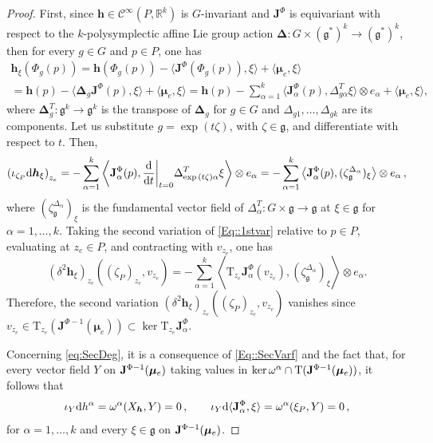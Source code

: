\documentclass[11pt]{article}
\theoremstyle{plain}
\theoremstyle{definition}
\newcommand\restr[2]{{%
  \left.\kern-\nulldelimiterspace %
  #1 %
  \right|_{#2} %
}}
\newcommand{\R}{\mathbb{R}}
\newcommand{\Cinfty}{\mathscr{C}^\infty}
\newcommand{\T}{\mathrm{T}}
\newcommand{\bh}{{\boldsymbol{h}}}
\renewcommand{\d}{\mathrm{d}}
\newcommand*{\inn}[1]{\iota_{#1}}
\def\d{\mathrm{d}}
\numberwithin{equation}{section}
\begin{document}
\begin{proof}
First, since $\bh\in \Cinfty(P,\R^k)$ is $G$-invariant and $\mathbf{J}^\Phi$ is equivariant with respect to the $k$-polysymplectic affine Lie group action $\boldsymbol{\Delta}:G \times (\mathfrak{g}^*)^k\rightarrow (\mathfrak{g}^*)^k$, then for every $g\in G$ and $p\in P$, one has
\begin{multline*}
\boldsymbol{h}_\xi(\Phi_g(p)) = \boldsymbol{h}(\Phi_g(p))-\langle \mathbf{J}^\Phi(\Phi_g(p)),\xi\rangle +\langle {\bm \mu}_e,\xi\rangle \\
= \boldsymbol{h}(p)-\langle \boldsymbol{\Delta}_g\mathbf{J}^\Phi(p),\xi\rangle +\langle \bm\mu_e,\xi\rangle %
=\boldsymbol{h}(p)-\sum_{\alpha=1}^k\langle \mathbf{J}_\alpha^\Phi(p),\Delta_{g\alpha}^T\xi\rangle \otimes e_\alpha+\langle \bm\mu_e,\xi\rangle,
\end{multline*}
where $\boldsymbol{\Delta}^T_g:\mathfrak{g}^k\rightarrow \mathfrak{g}^k$ is the transpose of $\boldsymbol{\Delta}_g$ for $g\in G$ and $\Delta_{g1},\ldots,\Delta_{gk}$  are its components. Let us substitute $g=\exp(t\zeta)$, with $\zeta\in\mathfrak{g}$, and differentiate with respect to $t$. Then,
\begin{equation}
\label{Eq::1stvar}
\left(\inn{\zeta_P}\d\boldsymbol{h}_\xi\right)_{z_e}=-\sum_{\alpha=1}^k\left\langle \mathbf{J}_\alpha^\Phi(p),\restr{\frac{\d}{\d t}}{t=0}{\Delta}^T_{\exp{(t\zeta)\alpha}}\xi \right\rangle\otimes e_\alpha=-\sum_{\alpha=1}^k\left\langle \mathbf{J}_\alpha^\Phi(p),(\zeta^{{\Delta}_\alpha}_{\mathfrak{g}})_{\xi}\right\rangle \otimes e_\alpha\,,
\end{equation}
where $(\zeta^{{\Delta}_\alpha}_{\mathfrak{g}})_{\xi}$ is the fundamental vector field of ${\Delta}_\alpha^T:G\times\mathfrak{g}\rightarrow \mathfrak{g}$ at $\xi\in\mathfrak{g}$ for $\alpha=1,\ldots,k$. Taking the second variation of \eqref{Eq::1stvar} relative to $p\in P$, evaluating at $z_e\in P$, and contracting with $v_{z_e}$, one has
\[
\left(\delta^2 \boldsymbol{h}_\xi \right)_{z_e}((\zeta_P)_{z_e},v_{z_e})=-\sum_{\alpha=1}^k\left\langle \T_{z_e}\mathbf{J}_\alpha^\Phi\left(v_{z_e}\right), (\zeta^{{\Delta}_\alpha}_{\mathfrak{g}})_{\xi}\right\rangle\otimes e_\alpha .
\]
Therefore, the second variation $\left(\delta^2 \boldsymbol{h}_\xi \right)_{z_e}((\zeta_P)_{z_e},v_{z_e})$ vanishes since $v_{z_e}\in \T_{z_e}(\mathbf{J}^{\Phi-1}(\boldsymbol{\mu}_e))\subset \ker \T_{z_e}\mathbf{J}^{\Phi}_\alpha$.

Concerning \eqref{eq:SecDeg}, it is a consequence of \eqref{Eq::SecVarf} and the fact that, for every vector field $Y$ on ${\bf J}^{\Phi-1}(\bm\mu_e)$ taking values in $\ker\omega^\alpha\cap \T({\bf J}^{\Phi-1}(\bm\mu_e))$, it follows that
$$
\iota_Y\d h^\alpha=\omega^\alpha(X_{\bm h},Y)=0\,,\qquad \iota_Y\d \langle {\bf J}_\alpha^\Phi,\xi\rangle =\omega^\alpha(\xi_P,Y)=0\,,
$$
for $\alpha=1,\ldots,k$ and every $\xi\in \mathfrak{g}$ on ${\bf J}^{\Phi-1}(\bm\mu_e)$. 
\end{proof}
\end{document}
